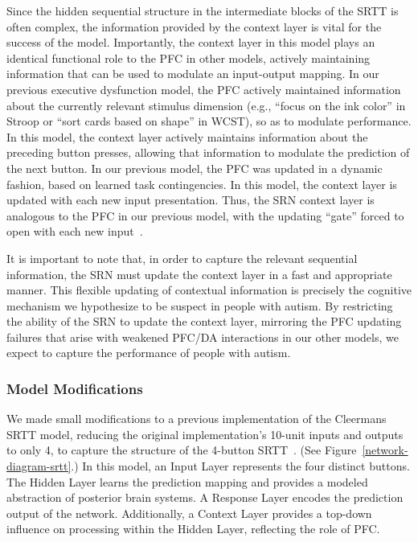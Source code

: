 Since the hidden sequential structure in the intermediate blocks of the SRTT is often complex, the information provided by the context layer is vital for the success of the model.  Importantly, the context layer in this model plays an identical functional role to the PFC in other models, actively maintaining information that can be used to modulate an input-output mapping.  In our previous executive dysfunction model, the PFC actively maintained information about the currently relevant stimulus dimension (e.g., ``focus on the ink color'' in Stroop or ``sort cards based on shape'' in WCST), so as to modulate performance.  In this model, the context layer actively maintains information about the preceding button presses, allowing that information to modulate the prediction of the next button.  In our previous model, the PFC was updated in a dynamic fashion, based on learned task contingencies.  In this model, the context layer is updated with each new input presentation.  Thus, the SRN context layer is analogous to the PFC in our previous model, with the updating ``gate'' forced to open with each new input~\cite{OReillyRC:2006:MWMW}.

It is important to note that, in order to capture the relevant sequential information, the SRN must update the context layer in a fast and appropriate manner.  This flexible updating of contextual information is precisely the cognitive mechanism we hypothesize to be suspect in people with autism.  By restricting the ability of the SRN to update the context layer, mirroring the PFC updating failures that arise with weakened PFC/DA interactions in our other models, we expect to capture the performance of people with autism.

\subsubsection{Model Modifications}
We made small modifications to a previous implementation of the Cleermans SRTT model, reducing the original implementation's 10-unit inputs and outputs to only 4, to capture the structure of the 4-button SRTT~\cite{OReillyRC:2000:Computational}.  (See Figure~\ref{network-diagram-srtt}.)  In this model, an Input Layer represents the four distinct buttons.  The Hidden Layer learns the prediction mapping and provides a modeled abstraction of posterior brain systems.  A Response Layer encodes the prediction output of the network.  Additionally, a Context Layer provides a top-down influence on processing within the Hidden Layer, reflecting the role of PFC.

